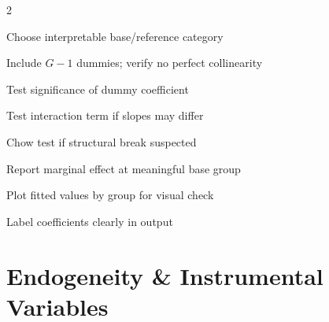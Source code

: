 \documentclass[10pt,a4paper]{article}
\begin{document}
\begin{tcolorbox}[checklist]
\begin{multicols}{2}
\begin{checklist}
  \item Choose interpretable base/reference category
  \item Include $G-1$ dummies; verify no perfect collinearity
  \item Test significance of dummy coefficient
  \item Test interaction term if slopes may differ
  \item Chow test if structural break suspected
  \item Report marginal effect at meaningful base group
  \item Plot fitted values by group for visual check
  \item Label coefficients clearly in output
\end{checklist}
\end{multicols}
\end{tcolorbox}

\section{Endogeneity \& Instrumental Variables}
\end{document}
